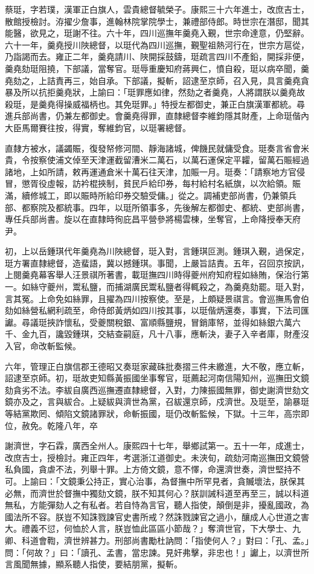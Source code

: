 \begin{pinyinscope}
蔡珽，字若璞，漢軍正白旗人，雲貴總督毓榮子。康熙三十六年進士，改庶吉士，散館授檢討。洊擢少詹事，進翰林院掌院學士，兼禮部侍郎。時世宗在潛邸，聞其能醫，欲見之，珽謝不往。六十年，四川巡撫年羹堯入覲，世宗命達意，仍堅辭。六十一年，羹堯授川陜總督，以珽代為四川巡撫，覲聖祖熱河行在，世宗方扈從，乃詣謁而去。雍正二年，羹堯請川、陜開採鼓鑄，珽疏言四川不產鉛，開採非便，羹堯劾珽阻撓，下部議，當奪官。珽辱重慶知府蔣興仁，憤自殺，珽以病卒聞，羹堯劾之，上詰責再三，始自承。下部議，擬斬，詔逮至京師，召入見，具言羹堯貪暴及所以抗拒羹堯狀，上諭曰：「珽罪應如律，然劾之者羹堯，人將謂朕以羹堯故殺珽，是羹堯得操威福柄也。其免珽罪。」特授左都御史，兼正白旗漢軍都統。尋進兵部尚書，仍兼左都御史。會羹堯得罪，直隸總督李維鈞隱其財產，上命珽偕內大臣馬爾賽往按，得實，奪維鈞官，以珽署總督。

直隸方被水，議蠲賑，復發帑修河間、靜海諸城，俾饑民就傭受食。珽奏言省會米貴，令按察使浦文倬至天津運截留漕米二萬石，以萬石運保定平糶，留萬石賑經過諸地，上如所請，敕再運通倉米十萬石往天津，加賑一月。珽奏：「請察地方官侵冒，懲胥役虛報，訪衿棍挾制，貧民戶給印券，每村給村名紙旗，以次給領。賑滿，續修城工，即以賑時所給印券交驗受傭。」從之。調補吏部尚書，仍兼領兵部、都察院及都統事。四年，以珽所領事多，先後解左都御史、都統、吏部尚書，專任兵部尚書。旋以在直隸時徇庇昌平營參將楊雲棟，坐奪官，上命降授奉天府尹。

初，上以岳鍾琪代年羹堯為川陜總督，珽入對，言鍾琪叵測。鍾琪入覲，過保定，珽方署直隸總督，造蜚語，冀以撼鍾琪。事聞，上嚴旨詰責。五年，召回京按訊，上閱羹堯幕客舉人汪景祺所著書，載珽撫四川時得夔州府知府程如絲賄，保治行第一。如絲守夔州，鬻私鹽，而捕湖廣民鬻私鹽者得輒殺之，為羹堯劾罷。珽入對，言其冤。上命免如絲罪，且擢為四川按察使。至是，上頗疑景祺言。會巡撫馬會伯劾如絲營私網利疏至，命侍郎黃炳如四川按其事，以珽偕炳還奏，事實，下法司匯讞。尋議珽挾詐懷私，受夔關稅銀、富順縣鹽規，冒銷庫帑，並得如絲銀六萬六千、金九百，讒毀鍾琪，交結查嗣庭，凡十八事，應斬決，妻子入辛者庫，財產沒入官，命改斬監候。

六年，管理正白旗信郡王德昭又奏珽家藏硃批奏摺三件未繳進，大不敬，應立斬，詔逮至京師。初，珽故吏知縣黃振國坐事奪官，珽薦起河南信陽知州，巡撫田文鏡劾貪劣不法。李紱自廣西巡撫遷直隸總督，入對，力陳振國無罪，御史謝濟世劾文鏡亦及之，言與紱合。上疑紱與濟世為黨，召紱還京師，戍濟世。及珽至，諭暴珽等結黨欺罔、傾陷文鏡諸罪狀，命斬振國，珽仍改斬監候，下獄。十三年，高宗即位，赦免。乾隆八年，卒

謝濟世，字石霖，廣西全州人。康熙四十七年，舉鄉試第一。五十一年，成進士，改庶吉士，授檢討。雍正四年，考選浙江道御史。未浹旬，疏劾河南巡撫田文鏡營私負國，貪虐不法，列舉十罪。上方倚文鏡，意不懌，命還濟世奏，濟世堅持不可。上諭曰：「文鏡秉公持正，實心治事，為督撫中所罕見者，貪贓壞法，朕保其必無，而濟世於督撫中獨劾文鏡，朕不知其何心？朕訓誡科道至再至三，誠以科道無私，方能彈劾人之有私者。若自恃為言官，聽人指使，顛倒是非，擾亂國政，為國法所不容。朕豈不知誅戮諫官史書所戒？然誅戮諫官之過小，釀成人心世道之害大。禮義不愆，何恤於人言，朕豈恤此區區小節哉？」奪濟世官，下大學士、九卿、科道會鞫，濟世辨甚力。刑部尚書勵杜訥問：「指使何人？」對曰：「孔、孟。」問：「何故？」曰：「讀孔、孟書，當忠諫。見奸弗擊，非忠也！」讞上，以濟世所言風聞無據，顯系聽人指使，要結朋黨，擬斬。


\end{pinyinscope}
